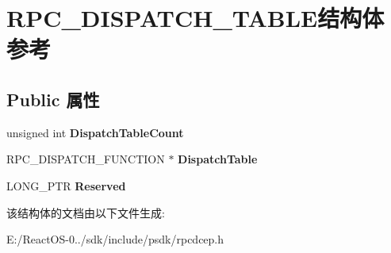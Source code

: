 \hypertarget{struct_r_p_c___d_i_s_p_a_t_c_h___t_a_b_l_e}{}\section{R\+P\+C\+\_\+\+D\+I\+S\+P\+A\+T\+C\+H\+\_\+\+T\+A\+B\+L\+E结构体 参考}
\label{struct_r_p_c___d_i_s_p_a_t_c_h___t_a_b_l_e}
\subsection*{Public 属性}
\begin{DoxyCompactItemize}
\item 
\mbox{\label{struct_r_p_c___d_i_s_p_a_t_c_h___t_a_b_l_e_a30f84cb10b6854f08801c4a832086177}} 
unsigned int {\bfseries Dispatch\+Table\+Count}
\item 
\mbox{\label{struct_r_p_c___d_i_s_p_a_t_c_h___t_a_b_l_e_a954e58beebfc6fc7bd5d66a5841b71c0}} 
R\+P\+C\+\_\+\+D\+I\+S\+P\+A\+T\+C\+H\+\_\+\+F\+U\+N\+C\+T\+I\+ON $\ast$ {\bfseries Dispatch\+Table}
\item 
\mbox{\label{struct_r_p_c___d_i_s_p_a_t_c_h___t_a_b_l_e_a49c8ba73d034a000b66c8be13fe8cc99}} 
L\+O\+N\+G\+\_\+\+P\+TR {\bfseries Reserved}
\end{DoxyCompactItemize}


该结构体的文档由以下文件生成\+:\begin{DoxyCompactItemize}
\item 
E\+:/\+React\+O\+S-\/0../sdk/include/psdk/rpcdcep.\+h\end{DoxyCompactItemize}
